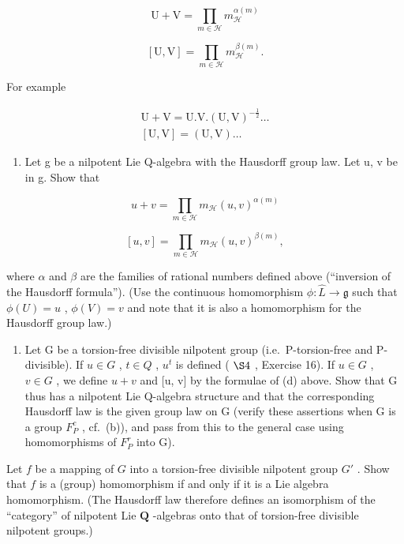 \[
\mathrm{U} + \mathrm{V} = \prod_ {m \in \mathcal {H}} m _ {\mathcal {H}} ^ {\alpha (m)}
\]

\[
[ \mathrm{U}, \mathrm{V} ] = \prod_ {m \in \mathcal {H}} m _ {\mathcal {H}} ^ {\beta (m)}.
\]

For example

\[
\begin{array}{c} \mathrm{U} + \mathrm{V} = \mathrm{U}. \mathrm{V}. (\mathrm{U}, \mathrm{V}) ^ {- \frac {1}{2}} \dots \\ {} [ \mathrm{U}, \mathrm{V} ] = (\mathrm{U}, \mathrm{V}) \dots \end{array}
\]

\begin{enumerate}
\def\labelenumi{(\alph{enumi})}
\setcounter{enumi}{3}
\tightlist
\item
  Let g be a nilpotent Lie Q-algebra with the Hausdorff group law. Let u, v be in g. Show that
\end{enumerate}

\[
u + v = \prod_ {m \in \mathcal {H}} m _ {\mathcal {H}} (u, v) ^ {\alpha (m)}
\]

\[
[ u, v ] = \prod_ {m \in \mathcal {H}} m _ {\mathcal {H}} (u, v) ^ {\beta (m)},
\]

where \(\alpha\) and \(\beta\) are the families of rational numbers defined above (``inversion of the Hausdorff formula''). (Use the continuous homomorphism \(\phi\colon\hat{L}\to\mathfrak{g}\) such that \(\phi(U)=u\) , \(\phi(V)=v\) and note that it is also a homomorphism for the Hausdorff group law.)

\begin{enumerate}
\def\labelenumi{(\alph{enumi})}
\setcounter{enumi}{4}
\tightlist
\item
  Let G be a torsion-free divisible nilpotent group (i.e.~P-torsion-free and P-divisible). If \(u \in G\) , \(t \in Q\) , \(u^{t}\) is defined ( \(\S 4\) , Exercise 16). If \(u \in G\) , \(v \in G\) , we define \(u + v\) and {[}u, v{]} by the formulae of (d) above. Show that G thus has a nilpotent Lie Q-algebra structure and that the corresponding Hausdorff law is the given group law on G (verify these assertions when G is a group \(F_{P}^{c}\) , cf.~(b)), and pass from this to the general case using homomorphisms of \(F_{P}^{r}\) into G).
\end{enumerate}

Let \(f\) be a mapping of \(G\) into a torsion-free divisible nilpotent group \(G'\) . Show that \(f\) is a (group) homomorphism if and only if it is a Lie algebra homomorphism. (The Hausdorff law therefore defines an isomorphism of the ``category'' of nilpotent Lie \(\mathbf{Q}\) -algebras onto that of torsion-free divisible nilpotent groups.)

